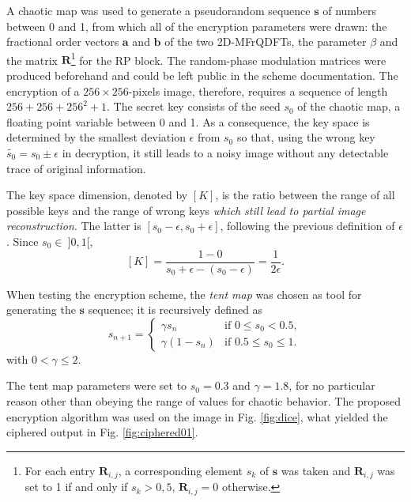 A chaotic map was used to generate a pseudorandom sequence $ \mathbf{s} $ of numbers between 0 and 1, from which all of the encryption parameters were drawn: the fractional order vectors $ \mathbf{a} $ and $ \mathbf{b} $ of the two 2D-MFrQDFTs, the parameter $ \beta $ and the matrix $ \mathbf{R} $\footnote{For each entry $ \mathbf{R}_{i,j} $, a corresponding element $ s_k $ of $ \mathbf{s} $ was taken and $ \mathbf{R}_{i,j} $ was set to 1 if and only if $ s_k > 0{,}5 $, $ \mathbf{R}_{i,j} = 0 $ otherwise.} for the RP block. The random-phase modulation matrices were produced beforehand and could be left public in the scheme documentation. The encryption of a $ 256 \times 256 $-pixels image, therefore, requires a sequence of length $ 256 + 256 + 256^2 + 1  $. The secret key consists of the seed $ s_0 $ of the chaotic map, a floating point variable between 0 and 1.
As a consequence, the key space is determined by the smallest deviation $ \epsilon $ from $ s_0 $ so that, using the wrong key $ \widetilde{s_0} = s_0 \pm \epsilon $ in decryption, it still leads to a noisy image without any detectable trace of original information.

The key space dimension, denoted by $ [K] $, is the ratio between the range of all possible keys and the range of wrong keys \textit{which still lead to partial image reconstruction}. The latter is $ [s_0 - \epsilon, s_0 + \epsilon] $, following the previous definition of $ \epsilon $. Since $ s_0 \in \ ]0,1[ $,
\begin{equation}
[K] = \frac{1 - 0}{s_0 + \epsilon - (s_0 - \epsilon)} = \frac{1}{2 \epsilon}.
\end{equation}

When testing the encryption scheme, the \textit{tent map} \cite{singh2008optical} was chosen as tool for generating the $ \mathbf{s} $ sequence; it is recursively defined as
\begin{equation}
s_{n+1} =
\begin{cases}
\gamma s_n & \text{if } 0 \leq s_0 < 0{.}5, \\
\gamma(1 - s_n) & \text{if } 0{.}5 \leq s_0 \leq 1.
\end{cases}
\end{equation}
with $0 <  \gamma \leq 2 $.

The tent map parameters were set to $ s_0 = 0{.}3 $ and $ \gamma = 1{.}8 $, for no particular reason other than obeying the range of values for chaotic behavior. The proposed encryption algorithm was used on the image in Fig. \ref{fig:dice}, what yielded the ciphered output in Fig. \ref{fig:ciphered01}.


